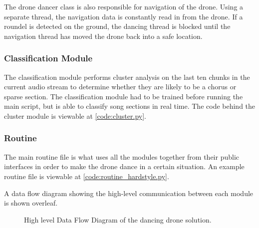 The drone dancer class is also responsible for navigation of the drone. Using a separate thread, the navigation
data is constantly read in from the drone. If a roundel is detected on the ground, the dancing thread is blocked
until the navigation thread has moved the drone back into a safe location.\\

\subsubsection{Classification Module}
The classification module performs cluster analysis on the last ten chunks in the current audio stream to
determine whether they are likely to be a chorus or sparse section. The classification module had to be trained before
running the main script, but is able to classify song sections in real time. The code behind the cluster module is viewable
at \eqref{code:cluster.py}.\\

\subsubsection{Routine}
The main routine file is what uses all the modules together from their public interfaces in order to make the
drone dance in a certain situation. An example routine file is viewable at \eqref{code:routine_hardstyle.py}.

A data flow diagram showing the high-level communication between each module is shown overleaf.

\onecolumn
\begin{figure*}[h]

\caption{High level Data Flow Diagram of the dancing drone solution.}
\end{figure*}

\begin{multicols}{2}
\twocolumn

\end{multicols}
\clearpage

